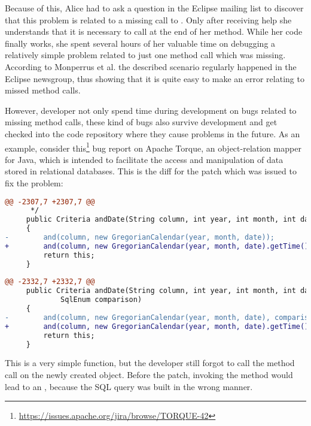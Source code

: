 Because of this, Alice had to ask a question in the Eclipse mailing list to discover that this problem is related to a missing call to .
Only after receiving help she understands that it is necessary to call  at the end of her  method.
While her code finally works, she spent several hours of her valuable time on debugging a relatively simple problem related to just one method call which was missing.
According to Monperrus et al. the described scenario regularly happened in the Eclipse newsgroup, thus showing that it is quite easy to make an error relating to missed method calls.

However, developer not only spend time during development on bugs related to missing method calls, these kind of bugs also survive development and get checked into the code repository where they cause problems in the future.
As an example, consider this\footnote{\url{https://issues.apache.org/jira/browse/TORQUE-42}} bug report on Apache Torque, an object-relation mapper for Java, which is intended to facilitate the access and manipulation of data stored in relational databases.
This is the diff for the patch which was issued to fix the problem:
\begin{lstlisting}[language=diff]
@@ -2307,7 +2307,7 @@
      */
     public Criteria andDate(String column, int year, int month, int date)
     {
-        and(column, new GregorianCalendar(year, month, date));
+        and(column, new GregorianCalendar(year, month, date).getTime());
         return this;
     }
 
@@ -2332,7 +2332,7 @@
     public Criteria andDate(String column, int year, int month, int date,
             SqlEnum comparison)
     {
-        and(column, new GregorianCalendar(year, month, date), comparison);
+        and(column, new GregorianCalendar(year, month, date).getTime(), comparison);
         return this;
     }
\end{lstlisting}
This is a very simple function, but the developer still forgot to call the  method call on the newly created  object.
Before the patch, invoking the  method would lead to an , because the SQL query was built in the wrong manner.

